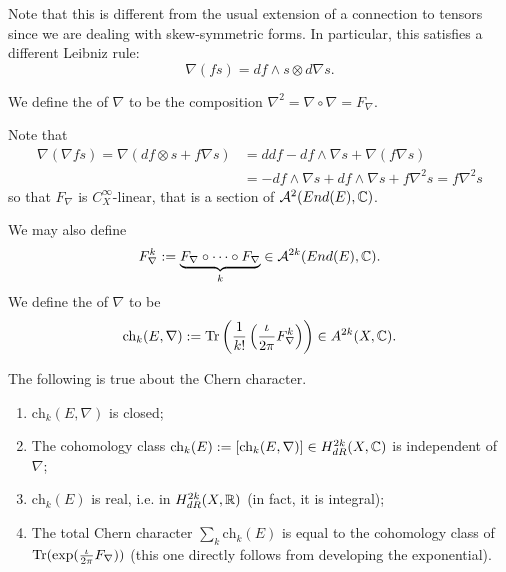 \begin{remark}
	Note that this is different from the usual extension of a connection to tensors since we are dealing with skew-symmetric forms. In particular, this satisfies a different Leibniz rule:
	\[
	\nabla(fs)=df\wedge s\otimes d\nabla s.
	\]
\end{remark}

\begin{definition}
	We define the  of $\nabla$ to be the composition $\nabla^2=\nabla\circ\nabla=F_\nabla$.
\end{definition}

Note that
\begin{align*}
	\nabla(\nabla fs)=\nabla(df\otimes s+f\nabla s)&=ddf-df\wedge\nabla s+\nabla(f\nabla s)	\\
	&=-df\wedge\nabla s+df\wedge\nabla s+f\nabla^2s=f\nabla^2s
\end{align*}
so that $F_\nabla$ is $C^\infty_X$-linear, that is a section of $\mathcal{A}^2(End(E),\mathbb C)$.

We may also define
%
\[F_\nabla^k:=\underbrace{F_\nabla\circ\cdots\circ F_\nabla}_k\in \mathcal{A}^{2k}(End(E),\mathbb C).
\]
We define the  of $\nabla$ to be
%
\[
\text{ch}_k(E,\nabla):= \text{Tr}\left(\frac{1}{k!}\left(\frac{\iota}{2\pi}F_\nabla^k\right)\right)\in A^{2k}(X,\mathbb C).
\]

\begin{theorem}
	The following is true about the Chern character.
	\begin{enumerate}
		\item $\text{ch}_k(E,\nabla)$ is closed;
		\item The cohomology class $\text{ch}_k(E):=[\text{ch}_k(E,\nabla)]\in H^{2k}_{dR}(X,\mathbb C)$ is independent of $\nabla$;
		\item $\text{ch}_k(E)$ is real, i.e. in $H^{2k}_{dR}(X,\mathbb R)$ (in fact, it is integral);
		\item The total Chern character $\sum_k\text{ch}_k(E)$ is equal to the cohomology class of $\text{Tr}(\exp(\frac{\iota}{2\pi}F_\nabla))$ (this one directly follows from developing the exponential).
	\end{enumerate}	
\end{theorem}

